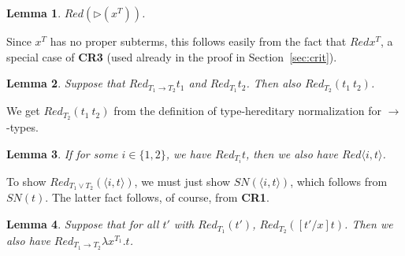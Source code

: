 \documentclass{article}
\newcommand{\red}[0]{\textit{Red}}
\newcommand{\redsub}[1]{\textit{Red}(\rhd(#1))}
\newcommand{\sn}[0]{\textit{SN}}
\newtheorem{lemma}{Lemma}
\begin{document}
\begin{lemma}
$\redsub{x^T}$.
\end{lemma}

\noindent Since $x^T$ has no proper subterms, this follows easily from
the fact that $\red{x^T}$, a special case of \textbf{CR3} (used
already in the proof in Section~\ref{sec:crit}).

\begin{lemma}
Suppose that $\red_{T_1\to T_2}{t_1}$ and $\red_{T_1}{t_2}$.  Then
also $\red_{T_2}(t_1\ t_2)$.
\end{lemma}

\noindent We get $\red_{T_2}(t_1\ t_2)$ from the definition of
type-hereditary normalization for $\to$-types.

\begin{lemma}
If for some $i\in\{1,2\}$, we have $\red_{T_i}{t}$, then we also have
$\red{\langle i,t\rangle}$.
\end{lemma}

\noindent To show $\red_{T_1\vee T_2}(\langle i,t\rangle)$, we must
just show $\sn(\langle i,t\rangle)$, which follows from $\sn(t)$.  The
latter fact follows, of course, from \textbf{CR1}.  

\begin{lemma}
\label{lem:lambda}
Suppose that for all $t'$ with $\red_{T_1}(t')$,
$\red_{T_2}([t'/x]t)$.  Then we also have $\red_{T_1 \to T_2}{\lambda x^{T_1}. t}$.
\end{lemma}
\end{document}
